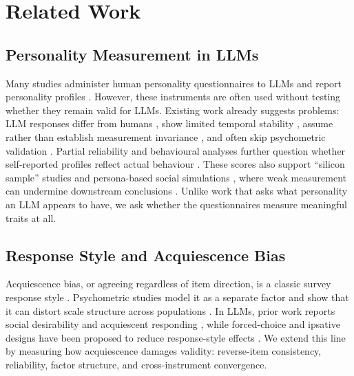 \documentclass[11pt]{article}
\begin{document}

\section{Related Work}

\subsection{Personality Measurement in LLMs}

Many studies administer human personality questionnaires to LLMs and report personality profiles \citep{miotto2023gpt3, serapio2025psychometric, bhandari2025evaluating, sorokovikova2024evaluating, lee2025trait, hagendorff2024machine, jiang2023personallm, huang2023psychobench}. However, these instruments are often used without testing whether they remain valid for LLMs. Existing work already suggests problems: LLM responses differ from humans \citep{xie2025aipsychobench}, show limited temporal stability \citep{bodroza2024personality}, assume rather than establish measurement invariance \citep{suhr2025challenging}, and often skip psychometric validation \citep{chen2025humanizing}. Partial reliability and behavioural analyses further question whether self-reported profiles reflect actual behaviour \citep{schaekermann2024personality, han2025personality}. These scores also support ``silicon sample'' studies \citep{argyle2023one, horton2023homo, aher2023using, ferreira2025matching} and persona-based social simulations \citep{chuang2023simulating, cau2025language, chuang2025debate, park2023generative}, where weak measurement can undermine downstream conclusions \citep{larooij2025validation, mannekote2025roleplaying}. Unlike work that asks what personality an LLM appears to have, we ask whether the questionnaires measure meaningful traits at all.

\subsection{Response Style and Acquiescence Bias}

Acquiescence bias, or agreeing regardless of item direction, is a classic survey response style \citep{couch1960yeasayers, crowne1960social, paulhus1991response}. Psychometric studies model it as a separate factor and show that it can distort scale structure across populations \citep{billiet2000modeling, baumgartner2007modeling}. In LLMs, prior work reports social desirability and acquiescent responding \citep{acerbi2024llm, salecha2024llm, acquiescence2025emnlp}, while forced-choice and ipsative designs have been proposed to reduce response-style effects \citep{brown2011forcedchoice, treaux2025forced}. We extend this line by measuring how acquiescence damages validity: reverse-item consistency, reliability, factor structure, and cross-instrument convergence.
\end{document}
